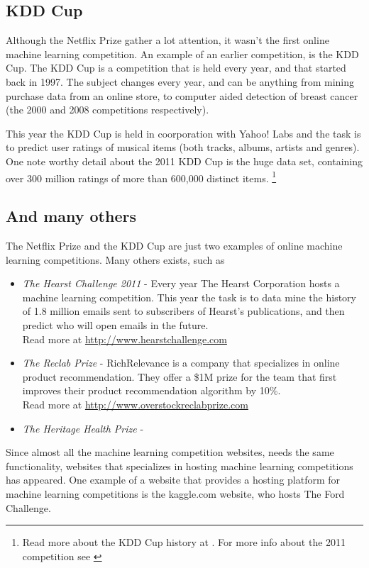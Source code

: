 \subsection{KDD Cup}
Although the Netflix Prize gather a lot attention, it wasn't the first online machine learning competition. An example of an earlier competition, is the KDD Cup. The KDD Cup is a competition that is held every year, and that started back in 1997. The subject changes every year, and can be anything from mining purchase data from an online store, to computer aided detection of breast cancer (the 2000 and 2008 competitions respectively).\par
This year the KDD Cup is held in coorporation with Yahoo! Labs and the task is to predict user ratings of musical items (both tracks, albums, artists and genres). One note worthy detail about the 2011 KDD Cup is the huge data set, containing over 300 million ratings of more than 600,000 distinct items. \footnote{Read more about the KDD Cup history at \citet{kdd_cup_center}. For more info about the 2011 competition see \citet{kdd_cup_2011}}

\subsection{And many others}
The Netflix Prize and the KDD Cup are just two examples of online machine learning competitions. Many others exists, such as
\begin{itemize}
    \item \emph{The Hearst Challenge 2011} - Every year The Hearst Corporation hosts a machine learning competition. This year the task is to data mine the history of 1.8 million emails sent to subscribers of Hearst's publications, and then predict who will open emails in the future. \\
        Read more at \url{http://www.hearstchallenge.com}
    \item \emph{The Reclab Prize} - RichRelevance is a company that specializes in online product recommendation. They offer a \$1M prize for the team that first improves their product recommendation algorithm by 10\%. \\
        Read more at \url{http://www.overstockreclabprize.com}
    \item \emph{The Heritage Health Prize} - 
\end{itemize}
Since almost all the machine learning competition websites, needs the same functionality, websites that specializes in hosting machine learning competitions has appeared. One example of a website that provides a hosting platform for machine learning competitions is the kaggle.com website, who hosts The Ford Challenge.

